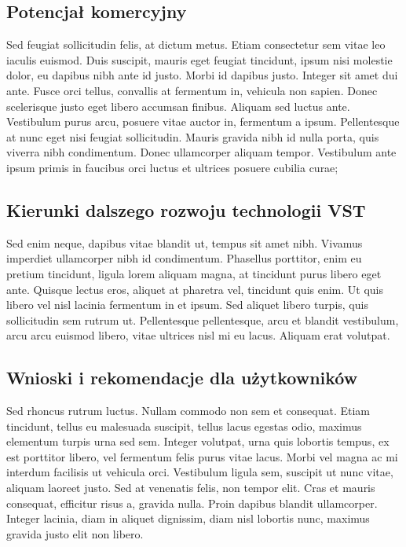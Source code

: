 \subsection{Potencjał komercyjny}
\begin{spacing}{1.5} %
    Sed feugiat sollicitudin felis, at dictum metus. Etiam consectetur sem vitae leo iaculis euismod. Duis suscipit, mauris eget feugiat tincidunt, ipsum nisi molestie dolor, eu dapibus nibh ante id justo. Morbi id dapibus justo. Integer sit amet dui ante. Fusce orci tellus, convallis at fermentum in, vehicula non sapien. Donec scelerisque justo eget libero accumsan finibus. Aliquam sed luctus ante. Vestibulum purus arcu, posuere vitae auctor in, fermentum a ipsum. Pellentesque at nunc eget nisi feugiat sollicitudin. Mauris gravida nibh id nulla porta, quis viverra nibh condimentum. Donec ullamcorper aliquam tempor. Vestibulum ante ipsum primis in faucibus orci luctus et ultrices posuere cubilia curae; 
\end{spacing} %

\subsection{Kierunki dalszego rozwoju technologii VST}
\begin{spacing}{1.5} %
    Sed enim neque, dapibus vitae blandit ut, tempus sit amet nibh. Vivamus imperdiet ullamcorper nibh id condimentum. Phasellus porttitor, enim eu pretium tincidunt, ligula lorem aliquam magna, at tincidunt purus libero eget ante. Quisque lectus eros, aliquet at pharetra vel, tincidunt quis enim. Ut quis libero vel nisl lacinia fermentum in et ipsum. Sed aliquet libero turpis, quis sollicitudin sem rutrum ut. Pellentesque pellentesque, arcu et blandit vestibulum, arcu arcu euismod libero, vitae ultrices nisl mi eu lacus. Aliquam erat volutpat. 
\end{spacing} %

\subsection{Wnioski i rekomendacje dla użytkowników}
\begin{spacing}{1.5} %
    Sed rhoncus rutrum luctus. Nullam commodo non sem et consequat. Etiam tincidunt, tellus eu malesuada suscipit, tellus lacus egestas odio, maximus elementum turpis urna sed sem. Integer volutpat, urna quis lobortis tempus, ex est porttitor libero, vel fermentum felis purus vitae lacus. Morbi vel magna ac mi interdum facilisis ut vehicula orci. Vestibulum ligula sem, suscipit ut nunc vitae, aliquam laoreet justo. Sed at venenatis felis, non tempor elit. Cras et mauris consequat, efficitur risus a, gravida nulla. Proin dapibus blandit ullamcorper. Integer lacinia, diam in aliquet dignissim, diam nisl lobortis nunc, maximus gravida justo elit non libero. 
\end{spacing} %
